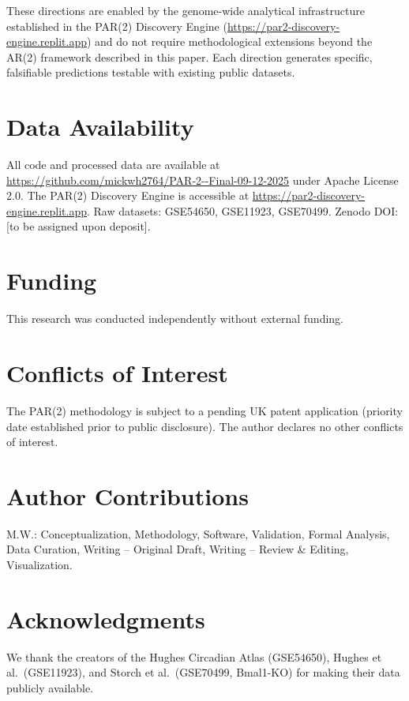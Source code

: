 \documentclass[11pt,letterpaper]{article}
\begin{document}
\noindent These directions are enabled by the genome-wide analytical infrastructure established in the PAR(2) Discovery Engine (\url{https://par2-discovery-engine.replit.app}) and do not require methodological extensions beyond the AR(2) framework described in this paper. Each direction generates specific, falsifiable predictions testable with existing public datasets.

\section*{Data Availability}

All code and processed data are available at \url{https://github.com/mickwh2764/PAR-2--Final-09-12-2025} under Apache License 2.0. The PAR(2) Discovery Engine is accessible at \url{https://par2-discovery-engine.replit.app}. Raw datasets: GSE54650, GSE11923, GSE70499. Zenodo DOI: [to be assigned upon deposit].

\section*{Funding}

This research was conducted independently without external funding.

\section*{Conflicts of Interest}

The PAR(2) methodology is subject to a pending UK patent application (priority date established prior to public disclosure). The author declares no other conflicts of interest.

\section*{Author Contributions}

M.W.: Conceptualization, Methodology, Software, Validation, Formal Analysis, Data Curation, Writing -- Original Draft, Writing -- Review \& Editing, Visualization.

\section*{Acknowledgments}

We thank the creators of the Hughes Circadian Atlas (GSE54650), Hughes et al.\ (GSE11923), and Storch et al.\ (GSE70499, Bmal1-KO) for making their data publicly available.
\end{document}
